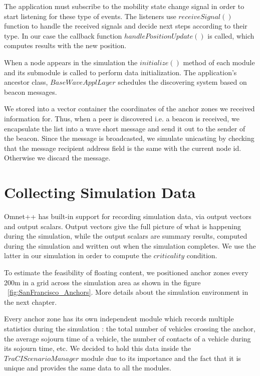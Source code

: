 The application must subscribe to the mobility state change signal in order
to start listening for these type of events. The listeners use $receiveSignal()$
function to handle the received signals and decide next steps according to their
type. In our case the callback function $handlePositionUpdate()$ is called, which
computes results with the new position.

When a node appears in the simulation the $initialize()$ method of each module
and its submodule is called to perform data initialization. The application's
ancestor class, $BaseWaveApplLayer$ schedules the discovering system based on
beacon messages.

We stored into a vector container the coordinates of the anchor zones we
received information for. Thus, when a peer is discovered i.e. a beacon is
received, we encapsulate the list into a wave short message and send it out to
the sender of the beacon. Since the message is broadcasted, we simulate
unicasting by checking that the message recipient address field is the same with
the current node id. Otherwise we discard the message.

\section {Collecting Simulation Data}

Omnet++ has built-in support for recording simulation data, via output vectors
and output scalars. Output vectors give the full picture of what is happening
during the simulation, while the output scalars are summary results, computed
during the simulation and written out when the simulation completes. We use the
latter in our simulation in order to compute the $criticality$ condition.

To estimate the feasibility of floating content, we positioned anchor zones
every 200m in a grid across the simulation area as shown in the figure
~\ref{fig:SanFrancisco_Anchors}. More details about the simulation environment
in the next chapter.

Every anchor zone has its own independent module which records multiple
statistics during the simulation : the total number of vehicles crossing the
anchor, the average sojourn time of a vehicle, the number of contacts of a
vehicle during its sojourn time, etc. We decided to hold this data inside the
$TraCIScenarioManager$ module due to its importance and the fact that it is
unique and provides the same data to all the modules.

